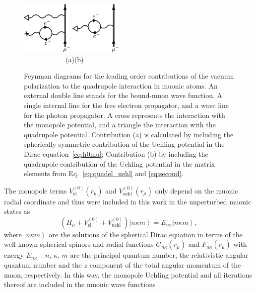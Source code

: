 \begin{figure}[b]
\includegraphics[width=0.22\textwidth]{pics/mixed}\hfill
\includegraphics[width=0.22\textwidth]{pics/quehl}\\
$\qquad\qquad\qquad$(a)\hfill(b)$\qquad\qquad\qquad$
\caption{
Feynman diagrams for the leading order contributions of the vacuum polarization to the quadrupole interaction in muonic atoms. An external double line stands for the bound-muon wave function. A single internal line for the free electron propagator, and a wave line for the photon propagator. A cross represents the interaction with the monopole potential, and a triangle the interaction with the quadrupole potential. Contribution (a) is calculated by including the spherically symmetric contribution of the Uehling potential in the Dirac equation~\eqref{eq:h0mu}; Contribution (b) by including the quadrupole contribution of the Uehling potential in the matrix elements from Eq.~\eqref{eq:quadel_uehl} and \eqref{eq:second}.
}
\label{fig:quehl}
\end{figure}
%
%

The monopole terms $V^{(0)}_{\text{el}}(r_\mu)$ and $V^{(0)}_{\text{uehl}}(r_\mu)$ only depend on the muonic radial coordinate and thus were included in this work in the unperturbed muonic states as
\begin{equation}
\left( H_\mu + V^{(0)}_{\text{el}}+V^{(0)}_{\text{uehl}}\right) \left|n\kappa m\right> = E_{n\kappa}\left|n\kappa m \right>,
\label{eq:h0mu}
\end{equation}
where $\left|n\kappa m \right>$ are the solutions of the spherical Dirac equation in terms of the well-known spherical spinors and radial functions $G_{n\kappa}(r_\mu)$ and $F_{n\kappa}(r_\mu)$ with energy $E_{n \kappa}$~\cite{greiner2000}. $n$, $\kappa$, $m$ are the principal quantum number, the relativistic angular quantum number and the $z$ component of the total angular momentum of the muon, respectively. In this way, the monopole Uehling potential and all iterations thereof are included in the muonic wave functions~\cite{michel2017}.
